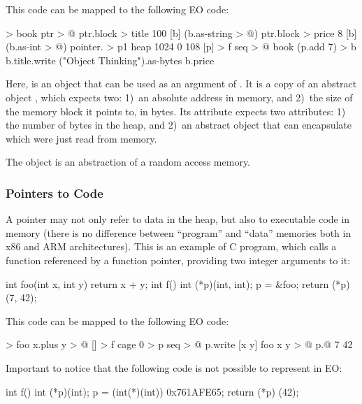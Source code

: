 \documentclass[sigplan,11pt,nonacm,natbib=false]{acmart}
\begin{document}
This code can be mapped to the following EO code:

\begin{ffcode}
[ptr] > book
  ptr > @
  ptr.block > title
    100
    [b] (b.as-string > @)
  ptr.block > price
    8
    [b] (b.as-int > @)
pointer. > p1
  heap 1024
  0
  108
[p] > f
  seq > @
    book (p.add 7) > b
    b.title.write ("Object Thinking").as-bytes
    b.price    
\end{ffcode}

Here,  is an object that can be used as an argument of . It is a copy of an abstract object , which expects two: 1)~an absolute address in memory, and 2)~the size of the memory block it points to, in bytes. Its attribute  expects two attributes: 1) the number of bytes in the heap, and 2)~an abstract object that can encapsulate  which were just read from memory.

The object  is an abstraction of a random access memory.

\subsubsection{Pointers to Code}

A pointer may not only refer to data in the heap, but also to executable code in memory (there is no difference between ``program'' and ``data'' memories both in x86 and ARM architectures). This is an example of C program, which calls a function referenced by a function pointer, providing two integer arguments to it:

\begin{ffcode}
int foo(int x, int y) {
  return x + y;
}
int f() {
  int (*p)(int, int);
  p = &foo;
  return (*p) (7, 42);
}
\end{ffcode}

This code can be mapped to the following EO code:

\begin{ffcode}
[x y] > foo
  x.plus y > @
[] > f
  cage 0 > p
  seq > @
    p.write
      [x y]
        foo x y > @
    p.@ 7 42
\end{ffcode}

Important to notice that the following code is not possible to represent in EO:

\begin{ffcode}
int f() {
  int (*p)(int);
  p = (int(*)(int)) 0x761AFE65;
  return (*p) (42);
}
\end{ffcode}
\end{document}
